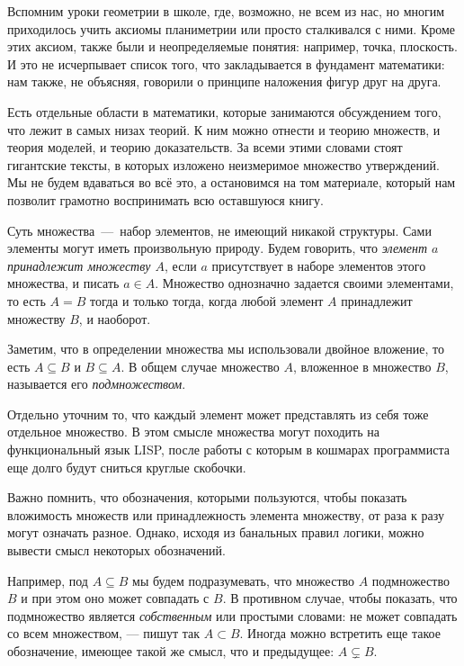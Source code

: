 
	Вспомним уроки геометрии в школе, где, возможно, не всем из нас, но многим приходилось учить аксиомы планиметрии 
	или просто сталкивался с ними. Кроме этих аксиом, также были и неопределяемые понятия: например, точка, плоскость. 
	И это не исчерпывает список того, что закладывается в фундамент математики: нам также, не объясняя, говорили о принципе 
	наложения фигур друг на друга.
	
	Есть отдельные области в математики, которые занимаются обсуждением того, что лежит в самых низах теорий. К ним можно отнести 
	и теорию множеств, и теория моделей, и теорию доказательств. За всеми этими словами стоят гигантские тексты, в которых изложено 
	неизмеримое множество утверждений. Мы не будем вдаваться во всё это, а остановимся на том материале, который нам позволит 
	грамотно воспринимать всю оставшуюся книгу.
	
	Суть множества~---~набор элементов, не имеющий никакой структуры. Сами элементы могут иметь произвольную природу. 
	Будем говорить, что \emph{элемент $a$ принадлежит множеству $A$}, если $a$ присутствует в наборе элементов этого множества, 
	и писать $a \in A$. Множество однозначно задается своими элементами, то есть $A = B$ тогда и только тогда, 
	когда любой элемент $A$ принадлежит множеству $B$, и наоборот.
	
	Заметим, что в определении множества мы использовали двойное вложение, то есть $A \subseteq B$ и $B \subseteq A$. 
	В общем случае множество $A$, вложенное в множество $B$, называется его \emph{подмножеством}.
	
	Отдельно уточним то, что каждый элемент может представлять из себя тоже отдельное множество. В этом смысле множества 
	могут походить на функциональный язык LISP, после работы с которым в кошмарах программиста еще долго будут сниться круглые скобочки.
	
	Важно помнить, что обозначения, которыми пользуются, чтобы показать вложимость множеств
	или принадлежность элемента множеству, от раза к разу могут означать разное. Однако, исходя
	из банальных правил логики, можно вывести смысл некоторых обозначений.
	
	Например, под $A \subseteq B$ мы будем подразумевать, что множество $A$ подмножество $B$ 
	и при этом оно может совпадать с $B$. В противном случае, чтобы показать, что подмножество
	является \emph{собственным} или простыми словами: не может совпадать со всем множеством, ---
	пишут так $A \subset B$. Иногда можно встретить еще такое обозначение, имеющее такой же смысл,
	что и предыдущее: $A \subsetneq B$.	
	
